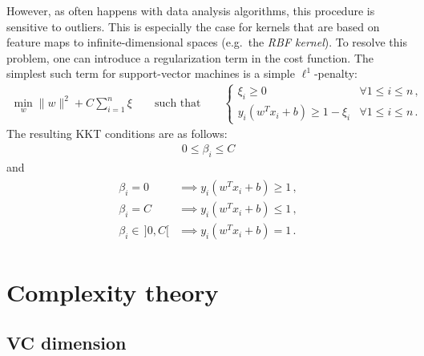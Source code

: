     However, as often happens with data analysis algorithms, this procedure is sensitive to outliers. This is especially the case for kernels that are based on feature maps to infinite-dimensional spaces (e.g.~the \textit{RBF kernel}). To resolve this problem, one can introduce a regularization term in the cost function. The simplest such term for support-vector machines is a simple $\ell^1$-penalty:
    \begin{gather}
        \min_w\|w\|^2 + C\sum_{i=1}^n\xi \qquad\text{such that}\qquad
        \begin{cases}
            \xi_i\geq0&\forall 1\leq i\leq n\,,\\
            y_i(w^Tx_i+b)\geq1-\xi_i&\forall 1\leq i\leq n\,.
        \end{cases}
    \end{gather}
    The resulting KKT conditions are as follows:
    \begin{gather}
        0\leq\beta_i\leq C
    \end{gather}
    and
    \begin{gather}
        \begin{aligned}
            \beta_i = 0&\implies y_i(w^Tx_i+b)\geq1\,,\\
            \beta_i = C&\implies y_i(w^Tx_i+b)\leq1\,,\\
            \beta_i\in\,]0,C[&\implies y_i(w^Tx_i+b)=1\,.
        \end{aligned}
    \end{gather}

\section{Complexity theory}
\subsection{VC dimension}

